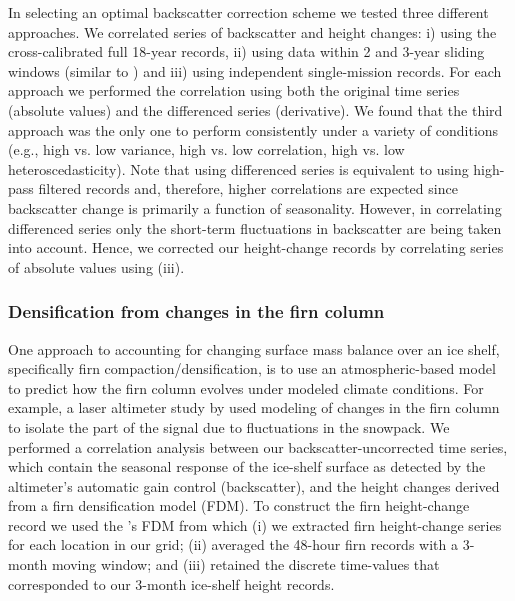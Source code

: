 In selecting an optimal backscatter correction scheme we tested three different approaches. We correlated series of backscatter and height changes: i) using the cross-calibrated full 18-year records, ii) using data within 2 and 3-year sliding windows (similar to \textcite{Khvorostovsky2012}) and iii) using independent single-mission records. For each approach we performed the correlation using both the original time series (absolute values) and the differenced series (derivative). We found that the third approach was the only one to perform consistently under a variety of conditions (e.g., high vs. low variance, high vs. low correlation, high vs. low heteroscedasticity). Note that using differenced series is equivalent to using high-pass filtered records and, therefore, higher correlations are expected since backscatter change is primarily a function of seasonality. However, in correlating differenced series only the short-term fluctuations in backscatter are being taken into account. Hence, we corrected our height-change records by correlating series of absolute values using (iii).

\subsubsection{Densification from changes in the firn column}

\noindent
One approach to accounting for changing surface mass balance over an ice shelf, specifically firn compaction/densification, is to use an atmospheric-based model to predict how the firn column evolves under modeled climate conditions. For example, a laser altimeter study by \textcite{Pritchard2012} used modeling of changes in the firn column to isolate the part of the signal due to fluctuations in the snowpack. We performed a correlation analysis between our backscatter-uncorrected time series, which contain the seasonal response of the ice-shelf surface as detected by the altimeter's automatic gain control (backscatter), and the height changes derived from a firn densification model (FDM). To construct the firn height-change record we used the \textcite{Ligtenberg2011}'s FDM from which (i) we extracted firn height-change series for each location in our grid; (ii) averaged the 48-hour firn records with a 3-month moving window; and (iii) retained the discrete time-values that corresponded to our 3-month ice-shelf height records.

